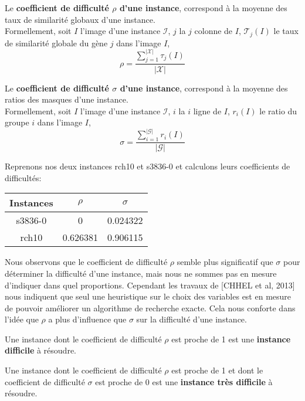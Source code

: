 \begin{definition}
Le \textbf{coefficient de difficulté $\rho$ d'une instance}, correspond à la moyenne des taux de similarité globaux d'une instance.\\
Formellement, soit $I$ l'image d'une instance $\mathcal{I}$, $j$ la $j$ colonne de $I$, $\mathcal{T}_j(I)$ le taux de similarité globale du gène $j$ dans l'image $I$,
$$ \rho=\frac{\sum_{j=1}^{|\mathcal{X}|}\tau_j(I)}{|\mathcal{X}|} $$
\end{definition}

\begin{definition}
Le \textbf{coefficient de difficulté $\sigma$ d'une instance}, correspond à la moyenne des ratios des masques d'une instance.\\
Formellement, soit $I$ l'image d'une instance $\mathcal{I}$, $i$ la $i$ ligne de $I$, $r_i(I)$ le ratio du groupe $i$ dans l'image $I$,
$$ \sigma=\frac{\sum_{i=1}^{|\mathcal{G}|}r_i(I)} {|\mathcal{G}|} $$
\end{definition}

Reprenons nos deux instances rch10 et s3836-0 et calculons leurs coefficients de difficultés:

\begin{center}
\begin{tabular}{|c|c|c|}
\hline 
Instances & $\rho$ & $\sigma$ \\ 
\hline 
s3836-0 & 0 & 0.024322 \\ 
\hline
rch10 & 0.626381 & 0.906115 \\ 
\hline
\end{tabular} 
\end{center}

Nous observons que le coefficient de difficulté $\rho$ semble plus significatif que $\sigma$ pour déterminer la difficulté d'une instance, mais nous ne sommes pas en mesure d'indiquer dans quel proportions. Cependant les travaux de [CHHEL et al, 2013] nous indiquent que seul une heuristique sur le choix des variables est en mesure de pouvoir améliorer un algorithme de recherche exacte. Cela nous conforte dans l'idée que $\rho$ a plus d'influence que $\sigma$ sur la difficulté d'une instance. 

\begin{proposition}
Une instance dont le coefficient de difficulté $\rho$ est proche de 1 est une \textbf{instance difficile} à résoudre.
\end{proposition}

\begin{proposition}
Une instance dont le coefficient de difficulté $\rho$ est proche de 1 et dont le coefficient de difficulté $\sigma$ est proche de 0 est une \textbf{instance très difficile} à résoudre.
\end{proposition}

